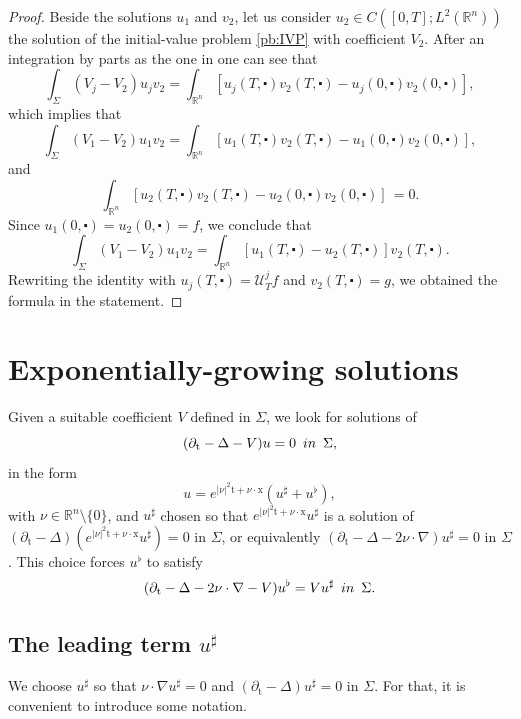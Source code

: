 \documentclass[10pt,a4paper]{amsart}
\newcommand{\R}{\mathbb{R}}
\newcommand{\tm}{\mathrm{t}}
\newcommand{\x}{\mathrm{x}}
\newcommand{\marnote}[1]{\marginpar{\footnotesize #1}} %
\begin{document}
\begin{proof}
Beside the solutions $u_1$ and $v_2$, let us consider $u_2 \in C([0,T]; L^2(\R^n))$ the 
solution of the initial-value problem \eqref{pb:IVP} with coefficient $V_2$. After an
integration by parts as the one in  one can see that
\[\int_\Sigma (V_j - V_2) u_j v_2 = \int_{\R^n} [u_j(T, \centerdot) v_2 (T, \centerdot) - u_j(0, \centerdot) v_2 (0, \centerdot)],\]
which implies that
\[\int_\Sigma (V_1 - V_2) u_1 v_2 = \int_{\R^n} [u_1(T, \centerdot) v_2 (T, \centerdot) - u_1(0, \centerdot) v_2 (0, \centerdot)],\]
and
\[\int_{\R^n} [u_2(T, \centerdot) v_2 (T, \centerdot) - u_2(0, \centerdot) v_2 (0, \centerdot)] \, = 0. \]
Since $u_1(0, \centerdot) = u_2(0, \centerdot) = f$, we conclude that
\[\int_\Sigma (V_1 - V_2) u_1 v_2 = \int_{\R^n} [u_1(T, \centerdot) - u_2(T, \centerdot)] v_2 (T, \centerdot).\]
Rewriting the identity with $u_j(T, \centerdot) = \mathcal{U}_T^j f$ and 
$v_2(T, \centerdot) = g$, we obtained the formula in the statement.
\end{proof}


\section{Exponentially-growing solutions}\label{sec:CGO}
Given a suitable coefficient $V$ defined in $\Sigma$,
we look for solutions of
\begin{equation}
(\partial_\tm - \Delta - V) u = 0 \enspace \textnormal{in} \enspace \Sigma,
\label{eq:heat}
\end{equation}
in the form
\begin{equation}
\label{id:GO}
u = e^{|\nu|^2 \tm + \nu \cdot \x} (u^\sharp + u^\flat),
\end{equation}
with $\nu \in \R^n \setminus \{ 0 \}$, and
$u^\sharp$ chosen so that $e^{|\nu|^2 \tm + \nu \cdot \x} u^\sharp$ is a solution of 
$(\partial_\tm - \Delta) (e^{|\nu|^2 \tm + \nu \cdot \x} u^\sharp) = 0$ in $\Sigma$,
or equivalently $(\partial_\tm - \Delta - 2 \nu \cdot \nabla) u^\sharp = 0 $ in
$\Sigma$. This choice forces $u^\flat$ to satisfy
\begin{equation}
(\partial_\tm - \Delta - 2 \nu \cdot \nabla - V) u^\flat = V u^\sharp \enspace \textnormal{in} \enspace \Sigma.
\label{eq:remainder-equation}
\end{equation}

\subsection{The leading term \texorpdfstring{$u^\sharp$}{usharp}}
We choose $u^\sharp$ so that $\nu \cdot \nabla u^\sharp = 0$ and $(\partial_\tm - \Delta) u^\sharp = 0$ in $\Sigma$. For that, it is convenient to introduce some notation.
\end{document}
